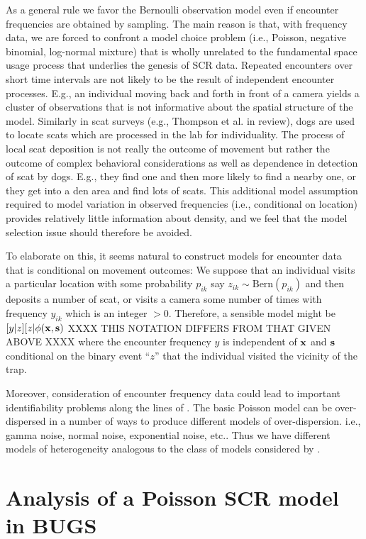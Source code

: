 As a general rule we favor the Bernoulli observation model even if
encounter frequencies are obtained by sampling.  The main reason is
that, with frequency data, we are forced to confront a model choice
problem (i.e., Poisson, negative binomial, log-normal mixture) that is
wholly unrelated to the fundamental space usage process that underlies
the genesis of SCR data. Repeated encounters over short time intervals
are not likely to be the result of independent encounter
processes. E.g., an individual moving back and forth in front of a
camera yields a cluster of observations that is not informative about
the spatial structure of the model. Similarly in scat surveys (e.g.,
Thompson et al. in review), dogs are used to locate scats which are
processed in the lab for individuality.  The process of local scat
deposition is not really the outcome of movement but rather the
outcome of complex behavioral considerations as well as dependence in
detection of scat by dogs. E.g., they find one and then more likely to
find a nearby one, or they get into a den area and find lots of scats.
This additional model assumption required to model variation in
observed frequencies (i.e., conditional on location) provides
relatively little information about density, and we feel that the
model selection issue should therefore be avoided.

To elaborate on this, it seems natural to construct models for
encounter data that is conditional on movement outcomes: We suppose
that an individual visits a particular location with some probability
$p_{ik}$ say $z_{ik}\sim  \mbox{Bern}(p_{ik})$ and then deposits a number of scat,
or visits a camera some number of times with frequency $y_{ik}$ which
is 
an integer $> 0$. Therefore, a sensible model might be
$[y|z][z|\phi({\bf x},{\bf s})$
XXXX THIS NOTATION DIFFERS FROM THAT GIVEN ABOVE XXXX
where the encounter frequency $y$ is independent of ${\bf x}$ and
${\bf s}$ conditional
on the binary event ``$z$'' that the individual visited the vicinity of
the trap.

Moreover, consideration of encounter frequency data could lead to
important identifiability problems along the lines of \citet{link:2003}. The
basic Poisson model can be over-dispersed in a number of ways to
produce different models of over-dispersion.  i.e., gamma noise,
normal noise, exponential noise, etc..  Thus we have different models
of heterogeneity analogous to the class of models considered by \citet{link:2003}.


\section{Analysis of a Poisson SCR model in BUGS}


